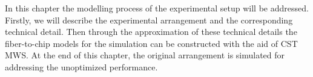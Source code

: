 
In this chapter the modelling process of the experimental setup will be addressed. Firstly, we will describe the experimental arrangement and the corresponding technical detail. Then through the approximation of these technical details the fiber-to-chip models for the simulation can be constructed with the aid of CST MWS. At the end of this chapter, the original arrangement is simulated for addressing the unoptimized performance.